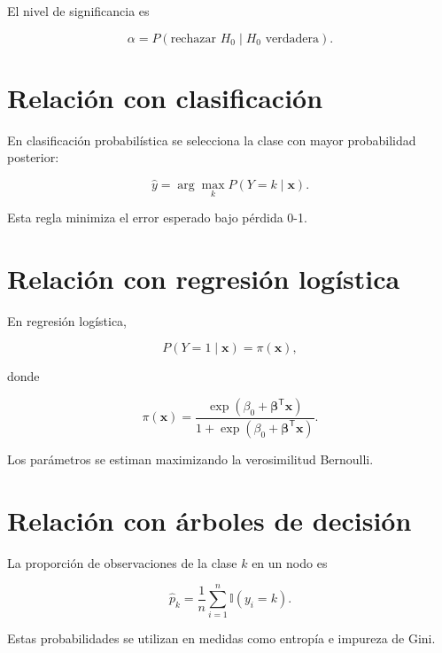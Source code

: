\documentclass[
  spanish,
  10.5pt,
  letterpaper,
  DIV=11,
  numbers=noendperiod,
  oneside,
  open=any]{scrreprt}
\theoremstyle{definition}
\theoremstyle{definition}
\theoremstyle{plain}
\theoremstyle{remark}
\begin{document}
El nivel de significancia es

\[
\alpha
=
P(\text{rechazar }H_0\mid H_0\text{ verdadera}).
\]

\section*{Relación con
clasificación}\label{relaciuxf3n-con-clasificaciuxf3n}


En clasificación probabilística se selecciona la clase con mayor
probabilidad posterior:

\[
\widehat{y}
=
\arg\max_{k}
P(Y=k\mid\mathbf{x}).
\]

Esta regla minimiza el error esperado bajo pérdida 0-1.

\section*{Relación con regresión
logística}\label{relaciuxf3n-con-regresiuxf3n-loguxedstica}


En regresión logística,

\[
P(Y=1\mid\mathbf{x})
=
\pi(\mathbf{x}),
\]

donde

\[
\pi(\mathbf{x})
=
\frac{
\exp(\beta_0+\boldsymbol{\beta}^{\mathsf T}\mathbf{x})
}{
1+
\exp(\beta_0+\boldsymbol{\beta}^{\mathsf T}\mathbf{x})
}.
\]

Los parámetros se estiman maximizando la verosimilitud Bernoulli.

\section*{Relación con árboles de
decisión}\label{relaciuxf3n-con-uxe1rboles-de-decisiuxf3n}


La proporción de observaciones de la clase \(k\) en un nodo es

\[
\widehat{p}_k
=
\frac{1}{n}
\sum_{i=1}^{n}
\mathbb{I}(y_i=k).
\]

Estas probabilidades se utilizan en medidas como entropía e impureza de
Gini.
\end{document}
